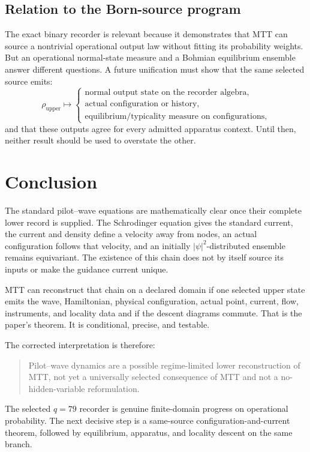 \documentclass[11pt]{article}
\theoremstyle{definition}
\theoremstyle{remark}
\begin{document}
\subsection{Relation to the Born-source program}

The exact binary recorder is relevant because it demonstrates that MTT can
source a nontrivial operational output law without fitting its probability
weights.  But an operational normal-state measure and a Bohmian equilibrium
ensemble answer different questions.  A future unification must show that
the same selected source emits:
\[
\rho_{\mathrm{upper}}
\longmapsto
\begin{cases}
\text{normal output state on the recorder algebra},\\
\text{actual configuration or history},\\
\text{equilibrium/typicality measure on configurations},
\end{cases}
\]
and that these outputs agree for every admitted apparatus context.  Until
then, neither result should be used to overstate the other.

\section{Conclusion}
\label{sec:conclusion}

The standard pilot--wave equations are mathematically clear once their
complete lower record is supplied.  The Schrodinger equation gives the
standard current, the current and density define a velocity away from
nodes, an actual configuration follows that velocity, and an initially
\(|\psi|^2\)-distributed ensemble remains equivariant.  The existence of
this chain does not by itself source its inputs or make the guidance current
unique.

MTT can reconstruct that chain on a declared domain if one selected upper
state emits the wave, Hamiltonian, physical configuration, actual point,
current, flow, instruments, and locality data and if the descent diagrams
commute.  That is the paper's theorem.  It is conditional, precise, and
testable.

The corrected interpretation is therefore:
\begin{quote}
Pilot--wave dynamics are a possible regime-limited lower reconstruction of
MTT, not yet a universally selected consequence of MTT and not a
no-hidden-variable reformulation.
\end{quote}
The selected \(q=79\) recorder is genuine finite-domain progress on
operational probability.  The next decisive step is a same-source
configuration-and-current theorem, followed by equilibrium, apparatus, and
locality descent on the same branch.
\end{document}
